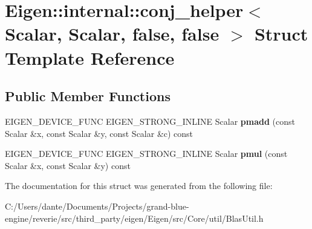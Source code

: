 \hypertarget{struct_eigen_1_1internal_1_1conj__helper_3_01_scalar_00_01_scalar_00_01false_00_01false_01_4}{}\section{Eigen\+::internal\+::conj\+\_\+helper$<$ Scalar, Scalar, false, false $>$ Struct Template Reference}
\label{struct_eigen_1_1internal_1_1conj__helper_3_01_scalar_00_01_scalar_00_01false_00_01false_01_4}
\subsection*{Public Member Functions}
\begin{DoxyCompactItemize}
\item 
\mbox{\label{struct_eigen_1_1internal_1_1conj__helper_3_01_scalar_00_01_scalar_00_01false_00_01false_01_4_a749c17e88cf10d2475791f45277cc803}} 
E\+I\+G\+E\+N\+\_\+\+D\+E\+V\+I\+C\+E\+\_\+\+F\+U\+NC E\+I\+G\+E\+N\+\_\+\+S\+T\+R\+O\+N\+G\+\_\+\+I\+N\+L\+I\+NE Scalar {\bfseries pmadd} (const Scalar \&x, const Scalar \&y, const Scalar \&c) const
\item 
\mbox{\label{struct_eigen_1_1internal_1_1conj__helper_3_01_scalar_00_01_scalar_00_01false_00_01false_01_4_a983d0e335017e8db84b32b99074708e5}} 
E\+I\+G\+E\+N\+\_\+\+D\+E\+V\+I\+C\+E\+\_\+\+F\+U\+NC E\+I\+G\+E\+N\+\_\+\+S\+T\+R\+O\+N\+G\+\_\+\+I\+N\+L\+I\+NE Scalar {\bfseries pmul} (const Scalar \&x, const Scalar \&y) const
\end{DoxyCompactItemize}


The documentation for this struct was generated from the following file\+:\begin{DoxyCompactItemize}
\item 
C\+:/\+Users/dante/\+Documents/\+Projects/grand-\/blue-\/engine/reverie/src/third\+\_\+party/eigen/\+Eigen/src/\+Core/util/Blas\+Util.\+h\end{DoxyCompactItemize}
